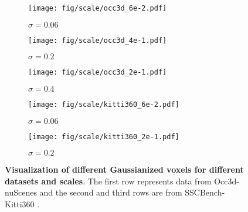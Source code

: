 
\begin{figure}[!t]
    \centering
    \begin{subfigure}{0.32\linewidth}
        \texttt{[image: fig/scale/occ3d\_6e-2.pdf]}
        \caption{$\sigma = 0.06$}
    \end{subfigure}
    \hfill
    \begin{subfigure}{0.32\linewidth}
        \texttt{[image: fig/scale/occ3d\_4e-1.pdf]}
        \caption{$\sigma = 0.2$}
    \end{subfigure}
    \hfill
    \begin{subfigure}{0.32\linewidth}
        \texttt{[image: fig/scale/occ3d\_2e-1.pdf]}
        \caption{$\sigma = 0.4$}
    \end{subfigure}

    \vspace{1em} %

    \begin{subfigure}{0.48\linewidth}
        \texttt{[image: fig/scale/kitti360\_6e-2.pdf]}
        \caption{$\sigma = 0.06$}
    \end{subfigure}
    \hfill
    \begin{subfigure}{0.48\linewidth}
        \texttt{[image: fig/scale/kitti360\_2e-1.pdf]}
        \caption{$\sigma = 0.2$}
    \end{subfigure}

    \caption{\textbf{Visualization of different Gaussianized voxels for different datasets and scales}. The first row represents data from Occ3d-nuScenes \cite{tian2023occ3d} and the second and third rows are from SSCBench-Kitti360 \cite{li2024sscbench}.}
    \label{fig:scale_render}
\end{figure}
